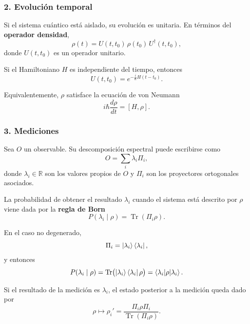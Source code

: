 \documentclass[12pt,a4paper]{article}
\theoremstyle{definition}
\theoremstyle{plain}
\theoremstyle{remark}
\begin{document}
\subsubsection*{2. Evolución temporal}

Si el sistema cuántico está aislado, su evolución es unitaria. En términos del \textbf{operador densidad},
\begin{equation*}
    \rho(t)=U(t,t_0)\,\rho(t_0)\,U^\dagger(t,t_0),
\end{equation*}
donde $U(t,t_0)$ es un operador unitario.

Si el Hamiltoniano $H$ es independiente del tiempo, entonces
\begin{equation*}
    U(t,t_0)=e^{-\frac{i}{\hbar}H(t-t_0)}.
\end{equation*}

Equivalentemente, $\rho$ satisface la ecuación de von Neumann
\begin{equation*}
    i\hbar \frac{d\rho}{dt} = [H,\rho].
\end{equation*}

\subsubsection*{3. Mediciones}

Sea $O$ un observable. Su descomposición espectral puede escribirse como
\begin{equation*}
    O=\sum_i \lambda_i \Pi_i,
\end{equation*}
donde $\lambda_i\in\mathbb{R}$ son los valores propios de $O$ y $\Pi_i$ son los proyectores ortogonales asociados.

La probabilidad de obtener el resultado $\lambda_i$ cuando el sistema está descrito por $\rho$ viene dada por la \textbf{regla de Born}
\begin{equation*}
    P(\lambda_i\mid \rho)=\operatorname{Tr}(\Pi_i \rho).
\end{equation*}

En el caso no degenerado,
\begin{equation*}
    \Pi_i=\ket{\lambda_i}\bra{\lambda_i},
\end{equation*}
y entonces
\begin{equation*}
    P(\lambda_i\mid \rho)
    =\operatorname{Tr}\bigl(\ket{\lambda_i}\bra{\lambda_i}\rho\bigr)
    =\braket{\lambda_i|\rho|\lambda_i}.
\end{equation*}

Si el resultado de la medición es $\lambda_i$, el estado posterior a la medición queda dado por
\begin{equation*}
    \rho \longmapsto \rho_i'=
    \frac{\Pi_i \rho \Pi_i}{\operatorname{Tr}(\Pi_i\rho)}.
\end{equation*}
\end{document}
